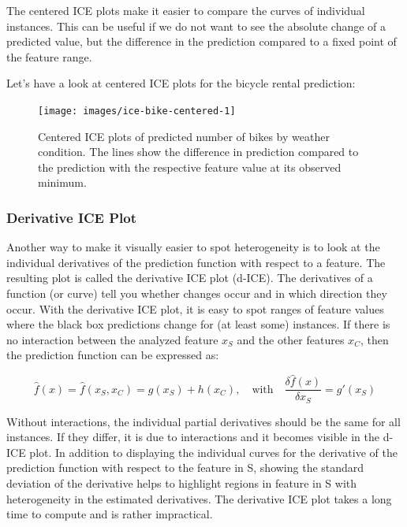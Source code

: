 \documentclass[
  12pt,
]{krantz}
\begin{document}
The centered ICE plots make it easier to compare the curves of individual instances.
This can be useful if we do not want to see the absolute change of a predicted value, but the difference in the prediction compared to a fixed point of the feature range.

Let's have a look at centered ICE plots for the bicycle rental prediction:

\begin{figure}

{\centering \texttt{[image: images/ice-bike-centered-1]} 

}

\caption{Centered ICE plots of predicted number of bikes by weather condition. The lines show the difference in prediction compared to the prediction with the respective feature value at its observed minimum.}\label{fig:ice-bike-centered}
\end{figure}

\hypertarget{derivative-ice-plot}{%
\subsubsection{Derivative ICE Plot}\label{derivative-ice-plot}}

Another way to make it visually easier to spot heterogeneity is to look at the individual derivatives of the prediction function with respect to a feature.
The resulting plot is called the derivative ICE plot (d-ICE).
The derivatives of a function (or curve) tell you whether changes occur and in which direction they occur.
With the derivative ICE plot, it is easy to spot ranges of feature values where the black box predictions change for (at least some) instances.
If there is no interaction between the analyzed feature \(x_S\) and the other features \(x_C\), then the prediction function can be expressed as:

\[\hat{f}(x)=\hat{f}(x_S,x_C)=g(x_S)+h(x_C),\quad\text{with}\quad\frac{\delta\hat{f}(x)}{\delta{}x_S}=g'(x_S)\]

Without interactions, the individual partial derivatives should be the same for all instances.
If they differ, it is due to interactions and it becomes visible in the d-ICE plot.
In addition to displaying the individual curves for the derivative of the prediction function with respect to the feature in S, showing the standard deviation of the derivative helps to highlight regions in feature in S with heterogeneity in the estimated derivatives.
The derivative ICE plot takes a long time to compute and is rather impractical.
\end{document}
